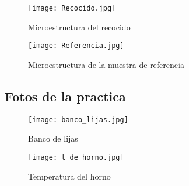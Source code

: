 \documentclass[a4paper, 9pt]{article}
\begin{document}
\begin{figure}[h] %

\hfill
\begin{minipage}[c]{.45\textwidth}
\begin{center}
\texttt{[image: Recocido.jpg]}
\caption{Microestructura del recocido}
\label{micro_recocido}
\end{center}
\end{minipage}
\hfill
\begin{minipage}[c]{.45\textwidth}
\begin{center}
\texttt{[image: Referencia.jpg]}
\caption{Microestructura de la muestra de referencia}
\label{micro_referencia}
\end{center}
\end{minipage}
\hfill
\end{figure}
\newpage
\subsection{Fotos de la practica}

\begin{figure}[h!] %

\hfill
\begin{minipage}[t]{.45\textwidth}
\begin{center}
\texttt{[image: banco\_lijas.jpg]}
\caption{Banco de lijas}
\label{banco_lijas}
\end{center}
\end{minipage}
\hfill
\begin{minipage}[t]{.45\textwidth}
\begin{center}
\texttt{[image: t\_de\_horno.jpg]}
\caption{Temperatura del horno}
\label{t_de_horno}
\end{center}
\end{minipage}
\hfill
\end{figure}
\end{document}

